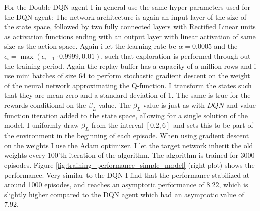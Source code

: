 For the Double DQN agent I in general use the same hyper parameters used for the DQN agent: The network architecture is again an input layer of the size of the state space, followed by two fully connected layers with Rectified Linear units as activation functions ending with an output layer with linear activation of same size as the action space. Again i let the learning rate be $\alpha = 0.0005$ and the $\epsilon_i = \max (\epsilon_{i-1} \cdot 0.9999, 0.01)$, such that exploration is performed through out the training period. Again the replay buffer has a capacity of a million rows and i use mini batches of size 64 to perform stochastic gradient descent on the weight of the neural network approximating the Q-function. I transform the states such that they are mean zero and a standard deviation of 1. The same is true for the rewards conditional on the $\beta_L$ value. The $\beta_L$ value is just as with $DQN$ and value function iteration added to the state space, allowing for a single solution of the model. I uniformly draw $\beta_L$ from the interval $[0.2, 6]$ and sets this to be part of the environment in the beginning of each episode. When using gradient descent on the weights I use the Adam optimizer. I let the target network inherit the old weights every 100'th iteration of the algorithm. The algorithm is trained for 3000 episodes. Figure \ref{fig:training_performance_simple_model} (right plot) shows the performance. Very similar to the DQN I find that the performance stabilized at around 1000 episodes, and reaches an asymptotic performance of $8.22$, which is slightly higher compared to the DQN agent which had an asymptotic value of $7.92$.

